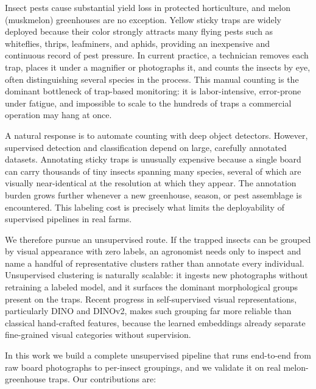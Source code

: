 \documentclass[10pt,a4paper,twocolumn]{article}
\begin{document}
Insect pests cause substantial yield loss in protected horticulture, and melon (muskmelon) greenhouses are no exception. Yellow sticky traps are widely deployed because their color strongly attracts many flying pests such as whiteflies, thrips, leafminers, and aphids, providing an inexpensive and continuous record of pest pressure. In current practice, a technician removes each trap, places it under a magnifier or photographs it, and counts the insects by eye, often distinguishing several species in the process. This manual counting is the dominant bottleneck of trap-based monitoring: it is labor-intensive, error-prone under fatigue, and impossible to scale to the hundreds of traps a commercial operation may hang at once.

A natural response is to automate counting with deep object detectors. However, supervised detection and classification depend on large, carefully annotated datasets. Annotating sticky traps is unusually expensive because a single board can carry thousands of tiny insects spanning many species, several of which are visually near-identical at the resolution at which they appear. The annotation burden grows further whenever a new greenhouse, season, or pest assemblage is encountered. This labeling cost is precisely what limits the deployability of supervised pipelines in real farms.

We therefore pursue an unsupervised route. If the trapped insects can be grouped by visual appearance with zero labels, an agronomist needs only to inspect and name a handful of representative clusters rather than annotate every individual. Unsupervised clustering is naturally scalable: it ingests new photographs without retraining a labeled model, and it surfaces the dominant morphological groups present on the traps. Recent progress in self-supervised visual representations, particularly DINO and DINOv2, makes such grouping far more reliable than classical hand-crafted features, because the learned embeddings already separate fine-grained visual categories without supervision.

In this work we build a complete unsupervised pipeline that runs end-to-end from raw board photographs to per-insect groupings, and we validate it on real melon-greenhouse traps. Our contributions are:
\end{document}
